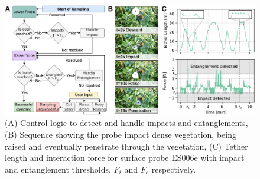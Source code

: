 
\begin{figure}[tbh]
    \centering
    \includegraphics[width=\linewidth]{figures/04_control.pdf}
    \caption{(A) Control logic to detect and handle impacts and entanglements, (B) Sequence showing the probe impact dense vegetation, being raised and eventually penetrate through the vegetation, (C) Tether length and interaction force for surface probe ES006e with impact and entanglement thresholds, $F_i$ and $F_e$ respectively.}
    \label{fig:4-control}
\end{figure}

